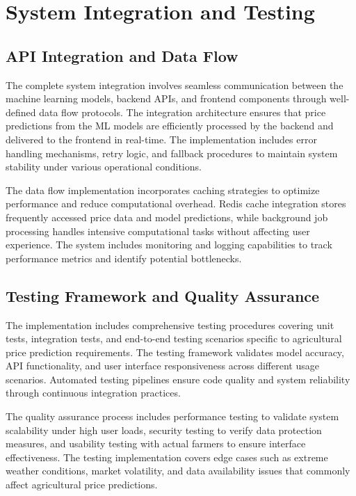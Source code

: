 \section{System Integration and Testing}

\subsection{API Integration and Data Flow}

The complete system integration involves seamless communication between the machine learning models, backend APIs, and frontend components through well-defined data flow protocols. The integration architecture ensures that price predictions from the ML models are efficiently processed by the backend and delivered to the frontend in real-time. The implementation includes error handling mechanisms, retry logic, and fallback procedures to maintain system stability under various operational conditions.

The data flow implementation incorporates caching strategies to optimize performance and reduce computational overhead. Redis cache integration stores frequently accessed price data and model predictions, while background job processing handles intensive computational tasks without affecting user experience. The system includes monitoring and logging capabilities to track performance metrics and identify potential bottlenecks.

\subsection{Testing Framework and Quality Assurance}

The implementation includes comprehensive testing procedures covering unit tests, integration tests, and end-to-end testing scenarios specific to agricultural price prediction requirements. The testing framework validates model accuracy, API functionality, and user interface responsiveness across different usage scenarios. Automated testing pipelines ensure code quality and system reliability through continuous integration practices.

The quality assurance process includes performance testing to validate system scalability under high user loads, security testing to verify data protection measures, and usability testing with actual farmers to ensure interface effectiveness. The testing implementation covers edge cases such as extreme weather conditions, market volatility, and data availability issues that commonly affect agricultural price predictions.

